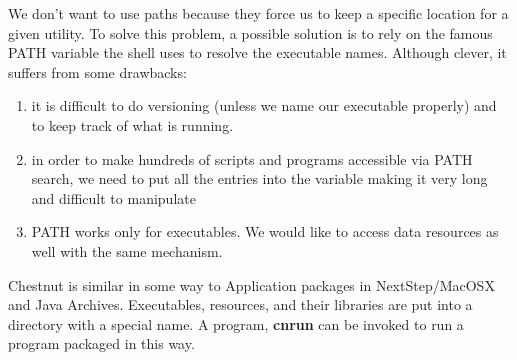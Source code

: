 We don't want to use paths because they force us to keep a specific location
for a given utility. To solve this problem, a possible solution is to rely on
the famous PATH variable the shell uses to resolve the executable names.
Although clever, it suffers from some drawbacks: 
\begin{enumerate}
\item it is difficult to do versioning (unless we name our executable properly)
and to keep track of what is running.
\item in order to make hundreds of scripts and programs accessible via PATH
search, we need to put all the entries into the variable making it very long
and difficult to manipulate
\item PATH works only for executables. We would like to access data
resources as well with the same mechanism.
\end{enumerate}

Chestnut is similar in some way to Application packages in NextStep/MacOSX
and Java Archives. Executables, resources, and their libraries are put into a
directory with a special name. A program, \textbf{cnrun} can be invoked to run
a program packaged in this way. 
